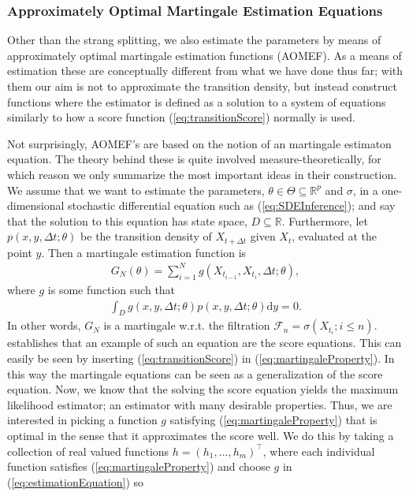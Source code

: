 \subsubsection{Approximately Optimal Martingale Estimation Equations}\label{subsubsec:approximatelyOptimalMartingaleEstimationEquation}
Other than the strang splitting, we also estimate the parameters by means of approximately optimal martingale estimation functions (AOMEF). As a means of estimation these are conceptually different from what we have done thus far; with them our aim is not to approximate the transition density, but instead construct functions where the estimator is defined as a solution to a system of equations similarly to how a score function (\ref{eq:transitionScore}) normally is used.

Not surprisingly, AOMEF's are based on the notion of an martingale estimaton equation. The theory behind these is quite involved measure-theoretically, for which reason we only summarize the most important ideas in their construction. We assume that we want to estimate the parameters, $\theta\in \Theta \subseteq \mathbb{R}^p$ and $\sigma$, in a one-dimensional stochastic differential equation such as (\ref{eq:SDEInference}); and say that the solution to this equation has state space, $D\subseteq \mathbb{R}$. Furthermore, let $p(x, y, \Delta t; \theta)$ be the transition density of $X_{t+\Delta t}$ given $X_t$, evaluated at the point $y$. Then a martingale estimation function is 
\begin{align}
    G_N(\theta) = \sum_{i = 1}^N g(X_{t_{i - 1}}, X_{t_i}, \Delta t; \theta), \label{eq:estimationEquation}
\end{align}
where $g$ is some function such that
\begin{align}
    \int_{D} g(x, y, \Delta t; \theta)p(x, y, \Delta t; \theta)\mathrm{d}y = 0. \label{eq:martingaleProperty}
\end{align}
In other words, $G_N$ is a martingale w.r.t. the filtration $\mathcal{F}_n = \sigma\left(X_{t_i}; i \leq n\right)$. \cite[p. 11]{StatisticalMethodsForSDE} establishes that an example of such an equation are the score equations. This can easily be seen by inserting (\ref{eq:transitionScore}) in (\ref{eq:martingaleProperty}). In this way the martingale equations can be seen as a generalization of the score equation. Now, we know that the solving the score equation yields the maximum likelihood estimator; an estimator with many desirable properties. Thus, we are interested in picking a function $g$ satisfying (\ref{eq:martingaleProperty}) that is optimal in the sense that it approximates the score well. We do this by taking a collection of real valued functions $h = (h_1, \dots, h_m)^\top$, where each individual function satisfies (\ref{eq:martingaleProperty}) and choose $g$ in (\ref{eq:estimationEquation}) so
